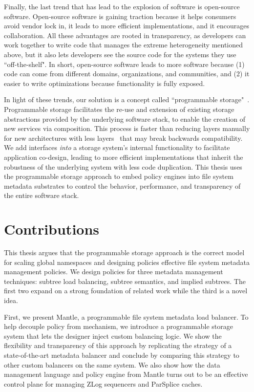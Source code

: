Finally, the last trend that has lead to the explosion of software is
open-source software. Open-source software is gaining traction because it helps
consumers avoid vendor lock in, it leads to more efficient implementations, and
it encourages collaboration. All these advantages are rooted in transparency,
as developers can work together to write code that manages the extreme
heterogeneity mentioned above, but it also lets developers see the source code
for the systems they use ``off-the-shelf". In short, open-source software leads
to more software because (1) code can come from different domains,
organizations, and communities, and (2) it easier to write optimizations
because functionality is fully exposed.

In light of these trends, our solution is a concept called ``programmable
storage"~\cite{sevilla:eurosys17-malacology, watkins:hot17-declstor}.
Programmable storage facilitates the re-use and extension of existing storage
abstractions provided by the underlying software stack, to enable the creation
of new services via composition. This process is faster than reducing layers
manually for new architectures with less layers~\cite{bent:login16-hpc-trends}
that may break backwards compatibility.  We add interfaces {\it into} a storage
system's internal functionality to facilitate application co-design, leading to
more efficient implementations that inherit the robustness of the underlying
system with less code duplication. This thesis uses the programmable storage
approach to embed policy engines into file system metadata substrates to
control the behavior, performance, and transparency of the entire software
stack.

\section{Contributions}

This thesis argues that the programmable storage approach is the correct model
for scaling global namespaces and designing policies effective file system
metadata management policies. We design policies for three metadata management
techniques: subtree load balancing, subtree semantics, and implied subtrees.
The first two expand on a strong foundation of related work while the third is
a novel idea.

First, we present Mantle, a programmable file system metadata load balancer.
To help decouple policy from mechanism, we introduce a programmable storage
system that lets the designer inject custom balancing logic. We show the
flexibility and transparency of this approach by replicating the strategy of a
state-of-the-art metadata balancer and conclude by comparing this strategy to
other custom balancers on the same system. We also show how the data management
language and policy engine from Mantle turns out to be an effective control
plane for managing ZLog sequencers and ParSplice caches.  

